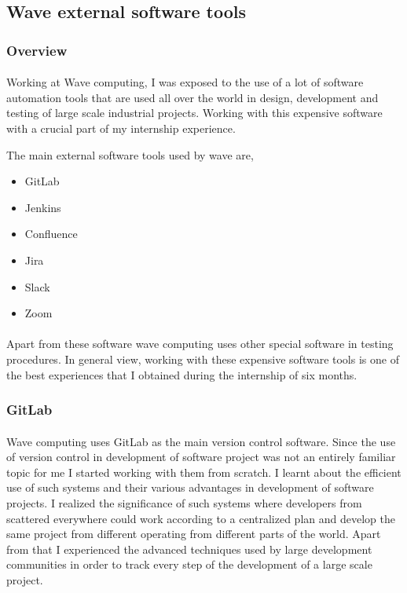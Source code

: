 
\newpage
\subsection{Wave external software tools}
\subsubsection{Overview}
\paragraph{}
Working at Wave computing, I was exposed to the use of a lot of software automation tools that are used all over the world in design, development and testing of large scale industrial projects. Working with this expensive software with a crucial part of my internship experience.

The main external software tools used by wave are,
\begin{itemize}
    \item GitLab
    \item Jenkins
    \item Confluence
    \item Jira
    \item Slack
    \item Zoom
\end{itemize}

\paragraph{}
Apart from these software wave computing uses other special software in testing procedures. In general view, working with these expensive software tools is one of the best experiences that I obtained during the internship of six months.

\subsubsection{GitLab}
\paragraph{}
Wave computing uses GitLab as the main version control software. Since the use of version control in development of software project was not an entirely familiar topic for me I started working with them from scratch. I learnt about the efficient use of such systems and their various advantages in development of software projects. I realized the significance of such systems where developers from scattered everywhere could work according to a centralized plan and develop the same project from different operating from different parts of the world. Apart from that I experienced the advanced techniques used by large development communities in order to track every step of the development of a large scale project. 

